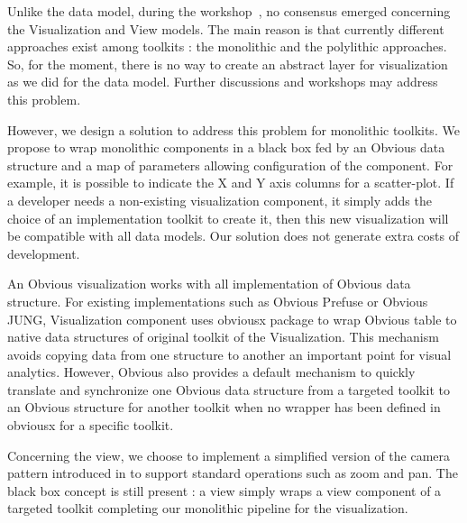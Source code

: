 Unlike the data model, during the workshop~\cite{vismaster2008}, no consensus emerged concerning the Visualization and View models. The main reason is that currently different approaches exist among toolkits : the monolithic and the polylithic approaches. So, for the moment, there is no way to create an abstract layer for visualization as we did for the data model. Further discussions and workshops may address this problem.

However, we design a solution to address this problem for monolithic toolkits. We propose to wrap monolithic components in a black box fed by an Obvious data structure and a map of parameters allowing configuration of the component. For example, it is possible to indicate the X and Y axis columns for a scatter-plot. If a developer needs a non-existing visualization component, it simply adds the choice of an implementation toolkit to create it, then this new visualization will be compatible with all data models. Our solution does not generate extra costs of development.


An Obvious visualization works with all implementation of Obvious data structure. For existing implementations such as Obvious Prefuse or Obvious JUNG, Visualization component uses obviousx package to wrap Obvious table to native data structures of original toolkit of the Visualization. This mechanism avoids copying data from one structure to another an important point for visual analytics. However, Obvious also provides a default mechanism to quickly translate and synchronize one Obvious data structure from a targeted toolkit to an Obvious structure for another  toolkit when no wrapper has been defined in obviousx for a specific toolkit.

Concerning the view, we choose to implement a simplified version of the camera pattern introduced in \cite{DesignPatternsIV} to support standard operations such as zoom and pan. The black box concept is still present : a view simply wraps a view component of a targeted toolkit completing our monolithic pipeline for the visualization.

